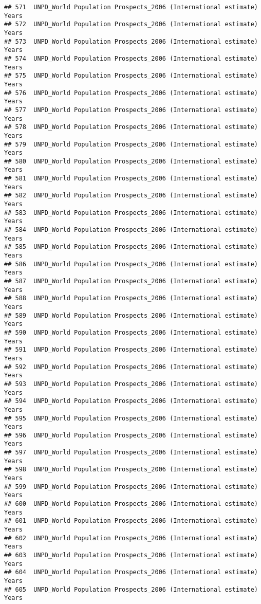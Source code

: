 \documentclass[]{article}
\begin{document}
\begin{verbatim}
## 571  UNPD_World Population Prospects_2006 (International estimate) Years
## 572  UNPD_World Population Prospects_2006 (International estimate) Years
## 573  UNPD_World Population Prospects_2006 (International estimate) Years
## 574  UNPD_World Population Prospects_2006 (International estimate) Years
## 575  UNPD_World Population Prospects_2006 (International estimate) Years
## 576  UNPD_World Population Prospects_2006 (International estimate) Years
## 577  UNPD_World Population Prospects_2006 (International estimate) Years
## 578  UNPD_World Population Prospects_2006 (International estimate) Years
## 579  UNPD_World Population Prospects_2006 (International estimate) Years
## 580  UNPD_World Population Prospects_2006 (International estimate) Years
## 581  UNPD_World Population Prospects_2006 (International estimate) Years
## 582  UNPD_World Population Prospects_2006 (International estimate) Years
## 583  UNPD_World Population Prospects_2006 (International estimate) Years
## 584  UNPD_World Population Prospects_2006 (International estimate) Years
## 585  UNPD_World Population Prospects_2006 (International estimate) Years
## 586  UNPD_World Population Prospects_2006 (International estimate) Years
## 587  UNPD_World Population Prospects_2006 (International estimate) Years
## 588  UNPD_World Population Prospects_2006 (International estimate) Years
## 589  UNPD_World Population Prospects_2006 (International estimate) Years
## 590  UNPD_World Population Prospects_2006 (International estimate) Years
## 591  UNPD_World Population Prospects_2006 (International estimate) Years
## 592  UNPD_World Population Prospects_2006 (International estimate) Years
## 593  UNPD_World Population Prospects_2006 (International estimate) Years
## 594  UNPD_World Population Prospects_2006 (International estimate) Years
## 595  UNPD_World Population Prospects_2006 (International estimate) Years
## 596  UNPD_World Population Prospects_2006 (International estimate) Years
## 597  UNPD_World Population Prospects_2006 (International estimate) Years
## 598  UNPD_World Population Prospects_2006 (International estimate) Years
## 599  UNPD_World Population Prospects_2006 (International estimate) Years
## 600  UNPD_World Population Prospects_2006 (International estimate) Years
## 601  UNPD_World Population Prospects_2006 (International estimate) Years
## 602  UNPD_World Population Prospects_2006 (International estimate) Years
## 603  UNPD_World Population Prospects_2006 (International estimate) Years
## 604  UNPD_World Population Prospects_2006 (International estimate) Years
## 605  UNPD_World Population Prospects_2006 (International estimate) Years

\end{verbatim}
\end{document}
